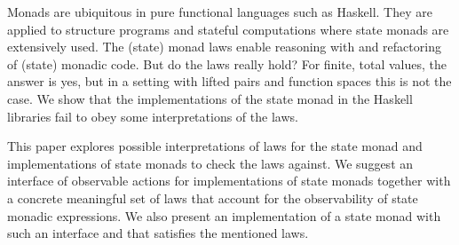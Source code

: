 Monads are ubiquitous in pure functional languages such as
Haskell.
%
They are applied to structure programs and stateful computations where
state monads are extensively used. %
The (state) monad laws enable reasoning with and refactoring of
(state) monadic code.
%
But do the laws really hold?
%
For finite, total values, the answer is yes, but in a setting with
lifted pairs and function spaces this is not the case.
%
We show that the implementations of the state monad in the Haskell
libraries fail to obey some interpretations of the laws.


This paper explores possible interpretations of laws for the state
monad and implementations of state monads to check the laws against.
%
We suggest an interface of observable actions for implementations of
state monads together with a concrete meaningful set of laws that
account for the observability of state monadic expressions.
%
We also present an implementation of a state monad with such an
interface and that satisfies the mentioned laws.
